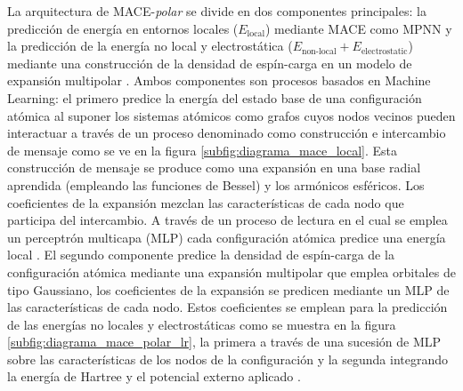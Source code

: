 \documentclass[12pt,letterpaper,oneside]{report}
\begin{document}
La arquitectura de MACE-\textit{polar} se divide en dos componentes principales: la predicción de energía en entornos locales ($E_{\text{local}}$) mediante MACE como MPNN \cite{batatia2023mace} y la predicción de la energía no local y electrostática ($E_{\text{non-local}} + E_{\text{electrostatic}}$) mediante una construcción de la densidad de espín-carga en un modelo de expansión multipolar \cite{batatia2026macepolar}. Ambos componentes son procesos basados en Machine Learning: el primero predice la energía del estado base de una configuración atómica al suponer los sistemas atómicos como grafos cuyos nodos vecinos pueden interactuar a través de un proceso denominado como construcción e intercambio de mensaje como se ve en la figura \ref{subfig:diagrama_mace_local}. Esta construcción de mensaje se produce como una expansión en una base radial aprendida (empleando las funciones de Bessel) y los armónicos esféricos. Los coeficientes de la expansión mezclan las características de cada nodo que participa del intercambio. A través de un proceso de lectura en el cual se emplea un perceptrón multicapa (MLP) cada configuración atómica predice una energía local \cite{batatia2023mace}. El segundo componente predice la densidad de espín-carga de la configuración atómica mediante una expansión multipolar que emplea orbitales de tipo Gaussiano, los coeficientes de la expansión se predicen mediante un MLP de las características de cada nodo. Estos coeficientes se emplean para la predicción de las energías no locales y electrostáticas como se muestra en la figura \ref{subfig:diagrama_mace_polar_lr}, la primera a través de una sucesión de MLP sobre las características de los nodos de la configuración y la segunda integrando la energía de Hartree y el potencial externo aplicado \cite{batatia2026macepolar}.\\
\end{document}
